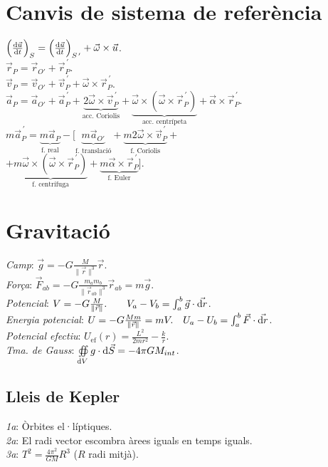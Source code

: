 \documentclass[11pt]{article}
\newcommand{\lp}{\left(}
\newcommand{\rp}{\right)}
\newcommand{\ci}{\textbullet\;}
\begin{document}
\begin{multicols}{4}
\section{Canvis de sistema de referència}
\ci $\lp \frac{\dif \vec{u}}{\dif t} \rp_S=\lp \frac{\dif \vec{u}}{\dif t} \rp_{S^{\, \prime}}+\vec{\omega}\times \vec{u}$. \\
\ci $\vec{r}_P = \vec{r}_{O'} + \vec{r}_{P}^{\, \prime}$. \\
\ci $\vec{v}_P = \vec{v}_{O'} + \vec{v}_{P}^{\, \prime} + \vec{\omega}\times\vec{r}_{P}^{\, \prime}$. \\
\ci $\vec{a}_P = \vec{a}_{O'} + \vec{a}_{P}^{\, \prime} + \underbrace{2\vec{\omega}\times\vec{v}_{P}^{\, \prime}}_{\text{acc. Coriolis}} + \underbrace{\vec{\omega}\times \lp \vec{\omega}\times \vec{r}_{P}^{\, \prime} \rp}_{\text{acc. centrípeta}} + \vec{\alpha}\times\vec{r}_{P}^{\, \prime}$. \\
\ci $m\vec{a}_{P}^{\, \prime} = \underbrace{m\vec{a}_P}_{\text{f. real}} - [ \underbrace{m\vec{a}_{O'}}_{\text{f. translació}} + \underbrace{m2\vec{\omega}\times\vec{v}_{P}^{\, \prime}}_{\text{f. Coriolis}} +$ \\
\qquad $+\underbrace{m\vec{\omega}\times \lp \vec{\omega}\times \vec{r}_{P}^{\, \prime} \rp}_{\text{f. centrífuga}} + \underbrace{m\vec{\alpha}\times\vec{r}_{P}^{\, \prime}}_{\text{f. Euler}} ]$.


\section{Gravitació}
\emph{Camp}: $\vec{g} = -G \frac{M}{\|\vec{r}\|^3} \vec{r}$. \\
\emph{Força}: $\vec{F}_{ab} = -G \frac{m_a m_b}{\|\vec{r}_{ab}\|^3} \vec{r}_{ab}=m\vec{g}$. \\
\emph{Potencial}: $V = -G \frac{M}{\|\vec{r}\|}. \qquad V_a-V_b = \int_a^b \vec{g} \cdot \vec{\dif r}$. \\
\emph{Energia potencial}: $U = -G \frac{Mm}{\|\vec{r}\|}=mV. \quad U_a-U_b = \int_a^b \vec{F} \cdot \vec{\dif r}$.\\
\emph{Potencial efectiu}: $U_\text{ef}(r) = \frac{L^2}{2mr^2} - \frac{k}{r}$.\\
\emph{Tma. de Gauss}: $\oiint\limits_{\dif V} g \cdot \dif{\vec{S}} = -4\pi GM_{int} $.

\subsection{Lleis de Kepler}
\emph{1a}: Òrbites el·líptiques. \\
\emph{2a}: El radi vector escombra àrees iguals en temps iguals. \\
\emph{3a}: $T^2=\frac{4\pi^2}{GM}R^3$ ($R$ radi mitjà).


\end{multicols}
\end{document}
